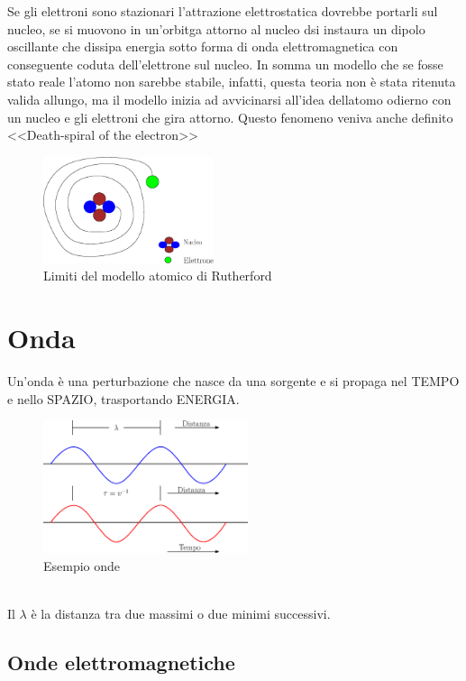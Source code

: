 Se gli elettroni sono stazionari l'attrazione elettrostatica dovrebbe portarli sul nucleo, se si
muovono in un'orbitga attorno al nucleo dsi instaura un dipolo oscillante che dissipa energia sotto
forma di onda elettromagnetica con conseguente coduta dell'elettrone sul nucleo. In somma un modello
che se fosse stato reale l'atomo non sarebbe stabile, infatti, questa teoria non è stata ritenuta valida
allungo, ma il modello inizia ad avvicinarsi all'idea dellatomo odierno con un nucleo e gli elettroni
che gira attorno. Questo fenomeno veniva anche definito <<Death-spiral of the electron>>
\begin{figure}[ht!]
  \centering
  \includegraphics[width=5cm]{img/instmodRuth.eps}
  \caption[limModAtom]{Limiti del modello atomico di Rutherford}
  \label{fig:limModAtom}
\end{figure}
\clearpage
\section{Onda}
\label{sec:onde}
\begin{defi}
  Un’onda è una perturbazione che nasce da una sorgente e si propaga nel TEMPO e nello SPAZIO,
  trasportando ENERGIA.
  \begin{figure}[ht!]
    \centering
    \includegraphics[width=6cm]{img/segnali.eps}
    \caption{Esempio onde}
    \label{fig:esonde}
  \end{figure}\\
  Il $\lambda$ è la distanza tra due massimi o due minimi successivi. 
\end{defi}

\subsection{Onde elettromagnetiche}
\label{sec:ondeElettro}

